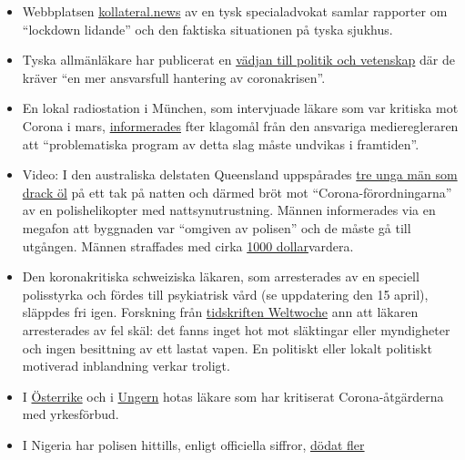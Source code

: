 \begin{itemize}
\tightlist
\item
  Webbplatsen \href{https://kollateral.news/}{kollateral.news} av en
  tysk specialadvokat samlar rapporter om ``lockdown lidande'' och den
  faktiska situationen på tyska sjukhus.
\item
  Tyska allmänläkare har publicerat en
  \href{https://aerzteinnenvorort.de/der-appell}{vädjan till politik och
  vetenskap} där de kräver ``en mer ansvarsfull hantering av
  coronakrisen''.
\item
  En lokal radiostation i München, som intervjuade läkare som var
  kritiska mot Corona i mars,
  \href{https://norberthaering.de/medienversagen/radiomuenchen-blm-meinungsvielfalt/}{informerades}
  fter klagomål från den ansvariga medieregleraren att ``problematiska
  program av detta slag måste undvikas i framtiden''.
\item
  Video: I den australiska delstaten Queensland uppspårades
  \href{https://twitter.com/Independent/status/1252911273597120513}{tre
  unga män som drack öl} på ett tak på natten och därmed bröt mot
  ``Corona-förordningarna'' av en polishelikopter med nattsynutrustning.
  Männen informerades via en megafon att byggnaden var ``omgiven av
  polisen'' och de måste gå till utgången. Männen straffades med cirka
  \href{https://www.dailystar.co.uk/news/world-news/police-helicopter-uses-night-vision-21899640}{1000
  dollar}vardera.
\item
  Den koronakritiska schweiziska läkaren, som arresterades av en
  speciell polisstyrka och fördes till psykiatrisk vård (se uppdatering
  den 15 april), släppdes fri igen. Forskning från
  \href{https://uncut-news.ch/wp-content/uploads/2020/04/Wer-l\%C3\%B6ste-den-Fehlalarm-aus.pdf}{tidskriften
  Weltwoche} ann att läkaren arresterades av fel skäl: det fanns inget
  hot mot släktingar eller myndigheter och ingen besittning av ett
  lastat vapen. En politiskt eller lokalt politiskt motiverad
  inblandning verkar troligt.
\item
  I
  \href{https://www.sn.at/panorama/oesterreich/arzt-droht-berufsverbot-wegen-kritik-an-corona-massnahmen-86594140}{Österrike}
  och i
  \href{https://magyarhang.org/belfold/2020/04/16/etikai-vizsgalat-indul-az-orvos-ellen-aki-szerint-nincs-jarvany-es-az-idosek-csak-a-felelemtol-halnak-meg/}{Ungern}
  hotas läkare som har kritiserat Corona-åtgärderna med yrkesförbud.
\item
  I Nigeria har polisen hittills, enligt officiella siffror,
  \href{https://www.bbc.com/news/world-africa-52317196}{dödat fler
}
\end{itemize}
